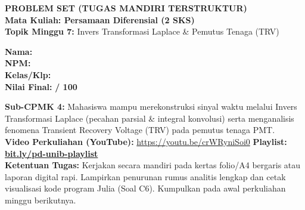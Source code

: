 \documentclass[10pt,a4paper]{article}
\begin{document}
\noindent\begin{minipage}[c]{0.68\textwidth}%
  {\large\textbf{\color{unibblue}PROBLEM SET (TUGAS MANDIRI TERSTRUKTUR)}}\\[1mm]
  {\normalsize\textbf{Mata Kuliah: Persamaan Diferensial (2 SKS)}}\\[0.5mm]
  {\small\textbf{Topik Minggu 7:} Invers Transformasi Laplace \& Pemutus Tenaga (TRV)}%
\end{minipage}%
\hfill%
\begin{minipage}[c]{0.30\textwidth}%
  \begin{tcolorbox}[colback=unibblue!5,colframe=unibblue,boxrule=0.6pt,arc=2pt,left=4pt,right=4pt,top=2pt,bottom=2pt]
    \scriptsize
    \textbf{Nama:} \dotfill\\[1.2mm]
    \textbf{NPM:} \dotfill\\[1.2mm]
    \textbf{Kelas/Klp:} \dotfill\\[1.2mm]
    \textbf{Nilai Final:} \hfill \textbf{/ 100}
  \end{tcolorbox}%
\end{minipage}\par

\vspace{1.5mm}

\begin{tcolorbox}[colback=boxbg,colframe=unibgold!90!black,boxrule=0.6pt,arc=2pt,left=5pt,right=5pt,top=3pt,bottom=3pt,title=\textbf{\scriptsize Capaian Pembelajaran (Sub-CPMK 4) \& Pedoman Pengerjaan Tugas}]
  \scriptsize
  \textbf{Sub-CPMK 4:} Mahasiswa mampu merekonstruksi sinyal waktu melalui Invers Transformasi Laplace (pecahan parsial \& integral konvolusi) serta menganalisis fenomena Transient Recovery Voltage (TRV) pada pemutus tenaga PMT.\\
  \textbf{Video Perkuliahan (YouTube):} \url{https://youtu.be/crWRyniSoi0} \hfill \textbf{Playlist:} \href{https://www.youtube.com/playlist?list=PLS5oOZWXZeTw}{\color{unibblue}\textbf{bit.ly/pd-unib-playlist}}\\\textbf{Ketentuan Tugas:} Kerjakan secara mandiri pada kertas folio/A4 bergaris atau laporan digital rapi. Lampirkan penurunan rumus analitis lengkap dan cetak visualisasi kode program Julia (Soal C6). Kumpulkan pada awal perkuliahan minggu berikutnya.
\end{tcolorbox}

\vspace{1.5mm}
\end{document}
